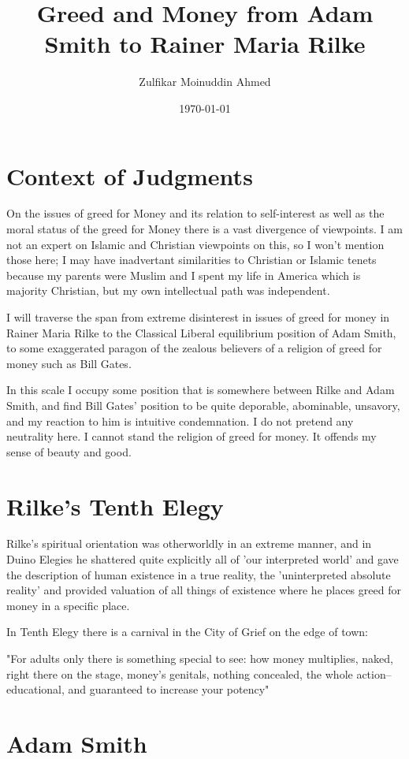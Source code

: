 \documentclass{amsart}
\title{Greed and Money from Adam Smith to Rainer Maria Rilke}
\author{Zulfikar Moinuddin Ahmed}
\date{\today}
\begin{document}
\maketitle

\section{Context of Judgments}
On the issues of greed for Money and its relation to self-interest as well as the moral status of the greed for Money there is a vast divergence of viewpoints.  I am not an expert on Islamic and Christian viewpoints on this, so I won't mention those here; I may have inadvertant similarities to Christian or Islamic tenets because my parents were Muslim and I spent my life in America which is majority Christian, but my own intellectual path was independent.  

I will traverse the span from extreme disinterest in issues of greed for money in Rainer Maria Rilke to the Classical Liberal equilibrium position of Adam Smith, to some exaggerated paragon of the zealous believers of a religion of greed for money such as Bill Gates.

In this scale I occupy some position that is somewhere between Rilke and Adam Smith, and find Bill Gates' position to be quite deporable, abominable, unsavory, and my reaction to him is intuitive condemnation.  I do not pretend any neutrality here. I cannot stand the religion of greed for money.  It offends my sense of beauty and good.

\section{Rilke's Tenth Elegy}

Rilke's spiritual orientation was otherworldly in an extreme manner, and in Duino Elegies he shattered quite explicitly all of 'our interpreted world' and gave the description of human existence in a true reality, the 'uninterpreted absolute reality' and provided valuation of all things of existence where he places greed for money in a specific place.

In Tenth Elegy there is a carnival in  the City of Grief on the edge of town:

"For adults only there is something special to see: how money multiplies, naked, 
right there on the stage, money's genitals, nothing concealed,
the whole action--educational, and guaranteed to increase your potency"


\section{Adam Smith}
\end{document}
